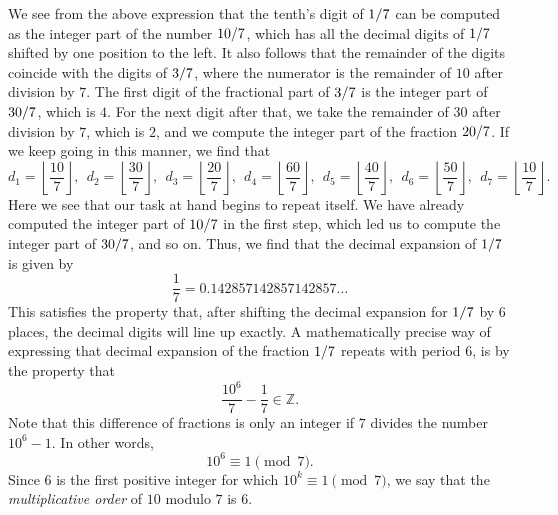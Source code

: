 We see from the above expression that the tenth's digit of $1/7$ can be computed as the integer part of the number $10/7$, which has all the decimal digits of $1/7$ shifted by one position to the left. It also follows that the remainder of the digits coincide with the digits of $3/7$, where the numerator is the remainder of $10$ after division by $7$. The first digit of the fractional part of $3/7$ is the integer part of $30/7$, which is $4$. For the next digit after that, we take the remainder of $30$ after division by $7$, which is $2$, and we compute the integer part of the fraction $20/7$. If we keep going in this manner, we find that
\begin{equation*}
  d_1=\left\lfloor\frac{10}{7}\right\rfloor,~~
  d_2=\left\lfloor\frac{30}{7}\right\rfloor,~~
  d_3=\left\lfloor\frac{20}{7}\right\rfloor,~~
  d_4=\left\lfloor\frac{60}{7}\right\rfloor,~~
  d_5=\left\lfloor\frac{40}{7}\right\rfloor,~~
  d_6=\left\lfloor\frac{50}{7}\right\rfloor,~~
  d_7=\left\lfloor\frac{10}{7}\right\rfloor.
\end{equation*}
Here we see that our task at hand begins to repeat itself. We have already computed the integer part of $10/7$ in the first step, which led us to compute the integer part of $30/7$, and so on. Thus, we find that the decimal expansion of $1/7$ is given by
\begin{equation*}
  \frac{1}{7}=0.142857142857142857\ldots
\end{equation*}
This satisfies the property that, after shifting the decimal expansion for $1/7$ by $6$ places, the decimal digits will line up exactly. A mathematically precise way of expressing that decimal expansion of the fraction $1/7$ repeats with period $6$, is by the property that
\begin{equation*}
  \frac{10^6}{7}-\frac{1}{7}\in\mathbb{Z}.
\end{equation*}
Note that this difference of fractions is only an integer if $7$ divides the number $10^6-1$. In other words,
\begin{equation*}
  10^6\equiv 1\pmod{7}.
\end{equation*}
Since $6$ is the first positive integer for which $10^k\equiv 1\pmod{7}$, we say that the \emph{multiplicative order} of $10$ modulo $7$ is $6$.


